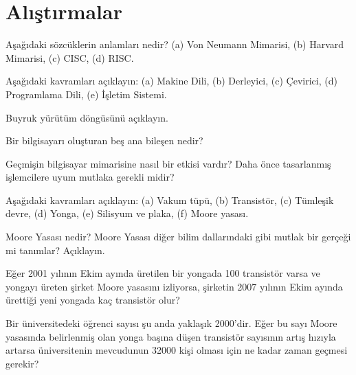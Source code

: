 \section*{Alıştırmalar}
\label{sec:giris-alistirmalar}

\begin{alistirma}[\kolay]
Aşağıdaki sözcüklerin anlamları nedir? (a) Von Neumann Mimarisi, (b) Harvard Mimarisi, (c) CISC, (d) RISC.
\end{alistirma}

\begin{alistirma}[\kolay]
Aşağıdaki kavramları açıklayın: (a) Makine Dili, (b) Derleyici, (c) Çevirici, (d) Programlama Dili, (e) İşletim Sistemi.
\end{alistirma}

\begin{alistirma}[\kolay]
Buyruk yürütüm döngüsünü açıklayın.
\end{alistirma}

\begin{alistirma}[\kolay]
Bir bilgisayarı oluşturan beş ana bileşen nedir?
\end{alistirma}

\begin{alistirma}[\orta]
Geçmişin bilgisayar mimarisine nasıl bir etkisi vardır? Daha önce tasarlanmış işlemcilere uyum mutlaka gerekli midir?
\end{alistirma}

\begin{alistirma}[\kolay]
Aşağıdaki kavramları açıklayın: (a) Vakum tüpü, (b) Transistör, (c) Tümleşik devre, (d) Yonga, (e) Silisyum ve plaka, (f) Moore yasası.
\end{alistirma}

\begin{alistirma}[\orta]
Moore Yasası nedir? Moore Yasası diğer bilim dallarındaki gibi mutlak bir gerçeği mi tanımlar? Açıklayın.
\end{alistirma}

\begin{alistirma}[\orta]
Eğer 2001 yılının Ekim ayında üretilen bir yongada 100 transistör varsa ve yongayı üreten şirket Moore yasasını izliyorsa, şirketin 2007 yılının Ekim ayında ürettiği yeni yongada kaç transistör olur?
\end{alistirma}

\begin{alistirma}[\orta]
Bir üniversitedeki öğrenci sayısı şu anda yaklaşık 2000'dir. Eğer bu sayı Moore yasasında belirlenmiş olan yonga başına düşen transistör sayısının artış hızıyla artarsa üniversitenin mevcudunun 32000 kişi olması için ne kadar zaman geçmesi gerekir?
\end{alistirma}

